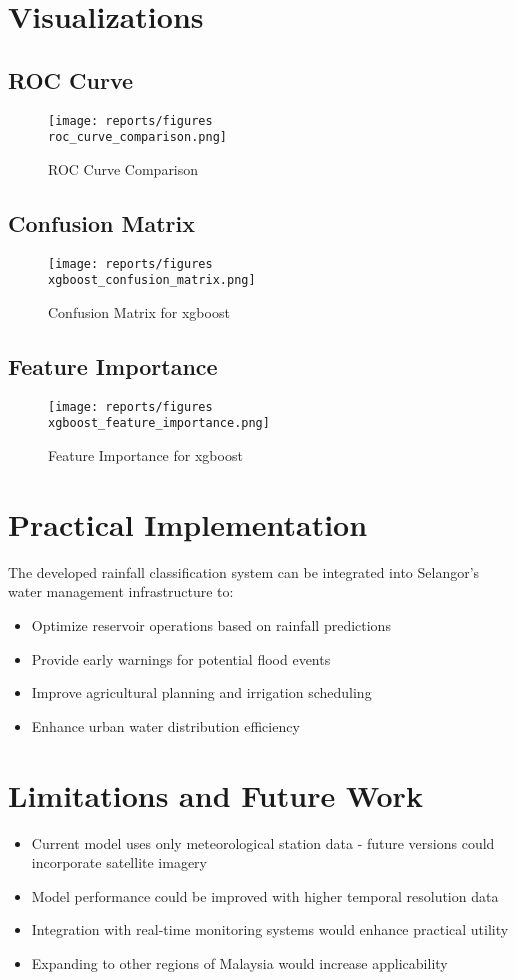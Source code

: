 \documentclass{article}
\begin{document}
\section{Visualizations}

\subsection{ROC Curve}
\begin{figure}[h]
\centering
\texttt{[image: reports/figures\\roc\_curve\_comparison.png]}
\caption{ROC Curve Comparison}
\end{figure}

\subsection{Confusion Matrix}
\begin{figure}[h]
\centering
\texttt{[image: reports/figures\\xgboost\_confusion\_matrix.png]}
\caption{Confusion Matrix for xgboost}
\end{figure}

\subsection{Feature Importance}
\begin{figure}[h]
\centering
\texttt{[image: reports/figures\\xgboost\_feature\_importance.png]}
\caption{Feature Importance for xgboost}
\end{figure}

\section{Practical Implementation}
The developed rainfall classification system can be integrated into Selangor's water management infrastructure to:
\begin{itemize}
    \item Optimize reservoir operations based on rainfall predictions
    \item Provide early warnings for potential flood events
    \item Improve agricultural planning and irrigation scheduling
    \item Enhance urban water distribution efficiency
\end{itemize}

\section{Limitations and Future Work}
\begin{itemize}
    \item Current model uses only meteorological station data - future versions could incorporate satellite imagery
    \item Model performance could be improved with higher temporal resolution data
    \item Integration with real-time monitoring systems would enhance practical utility
    \item Expanding to other regions of Malaysia would increase applicability
\end{itemize}
\end{document}
